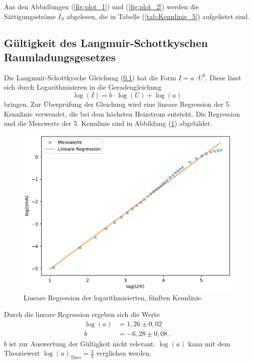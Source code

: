 Aus den Abbidlungen (\ref{fig:plot_1}) und (\ref{fig:plot_2}) werden die Sättigungsströme $I_S$ abgelesen, die in Tabelle (\ref{tab:Kennlinie_5}) aufgelistet sind.

\subsection{Gültigkeit des Langmuir-Schottkyschen Raumladungsgesetzes}
Die Langmuir-Schottkysche Gleichung (\ref{}) hat die Form $I = a \cdot U^b$. Diese lässt sich durch Logarithmisieren 
in die Geradengleichung 
    \begin{equation*}
    \log(I) = b \cdot \log(U) + \log(a)
    \end{equation*}
bringen. Zur Überprüfung der Gleichung wird eine lineare Regression der 5. Kennlinie verwendet, die bei dem 
höchsten Heizstrom entsteht. Die Regression und die Messwerte der 5. Kennlinie sind in Abbildung (\ref{fig:plot_3}) abgebildet. 
\begin{figure}
    \centering
    \includegraphics[width=\textwidth]{plot_3.pdf}
    \caption{Lineare Regression der logarithmisierten, fünften Kennlinie.}
    \label{fig:plot_3}
\end{figure}

Durch die lineare Regression ergeben sich 
die Werte
\begin{align}
    \log(a) &= 1,26 \pm 0,02 \\
    b &= -6,28 \pm 0,08 \, .
\end{align}
$b$ ist zur Auswertung der Gültigkeit nicht relevant. $\log(a)$ kann mit dem Theoriewert $\log(a)_{\text{Theo}}= \frac{3}{2}$ verglichen werden.

